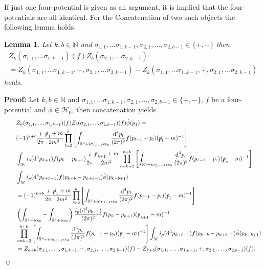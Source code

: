 \documentclass[oneside,reqno,12pt]{amsart}
\newtheorem{Lemma}[Def]{Lemma}
\begin{document}
If just one four-potential is given as an argument, it is implied that the four-potentials are all identical. For the Concatenation of two such objects the following lemma holds.
\begin{Lemma}\label{Z_concatenation}
Let \(k,b\in\mathbb{N}\) and \(\sigma_{1,1},\dots\sigma_{1,k-1},\sigma_{2,1},\dots,\sigma_{2,b-1}\in \{+,-\}\) then 
\begin{align}\tag*{}
Z_k(\sigma_{1,1},\dots\sigma_{1,k-1})(f) Z_b(\sigma_{2,1},\dots\sigma_{2,k-1})\\
=Z_k (\sigma_{1,1},\dots\sigma_{1,k-1},-,\sigma_{2,1},\dots\sigma_{2,k-1})-
Z_k (\sigma_{1,1},\dots\sigma_{1,k-1},+,\sigma_{2,1},\dots\sigma_{2,k-1})
\end{align}
holds.
\end{Lemma}
{\bf Proof:} Let \(k,b\in\mathbb{N}\) and \(\sigma_{1,1},\dots\sigma_{1,k-1},\sigma_{2,1},\dots,\sigma_{2,b-1}\in \{+,-\}\), \(f\) be a four-potential and \(\phi\in \mathcal{H}_0\), then concatenation yields
\begin{align}\tag*{}
&Z_k(\sigma_{1,1},\dots\sigma_{1,k-1})(f) Z_b(\sigma_{2,1},\dots\sigma_{2,k-1})(f) \hat{\phi}(p_1)=\\\tag*{}
&(-1)^{k+b}\frac{i}{2\pi}\frac{\slashed{p}_1+m}{2m^2} \prod_{l=2}^{k} \left[ \int_{\mathbb{R}^4+i\sigma_{1,l-1} \epsilon e_0}\frac{\text{d}^4p_l}{(2\pi)^{2}} \slashed{f}(p_{l-1}-p_l)  (\slashed{p}_l-m)^{-1}  
 \right]\\\tag*{}
& \int_{\mathcal{M}}  i_p(\text{d}^4p_{k+1})\slashed{f}(p_{k}-p_{k+1})
 \frac{i}{2\pi}  \frac{\slashed{p}_{k+1}+m}{2m^2} \prod_{c=k+2}^{b+k} \left[ \int_{\mathbb{R}^4+i\sigma_{2,c-1} \epsilon e_0}\frac{\text{d}^4p_c}{(2\pi)^{2}} \slashed{f}(p_{c-1}-p_c)  (\slashed{p}_c-m)^{-1}  
 \right]\\\tag*{}
 &\int_{\mathcal{M}}  i_p(\text{d}^4p_{k+b+1})\slashed{f}(p_{k+b}-p_{k+b+1})\hat{\phi}(p_{k+b+1})\\\tag*{}
 &=(-1)^{k+b}\frac{i}{2\pi}\frac{\slashed{p}_1+m}{2m^2} \prod_{l=2}^{k} \left[ \int_{\mathbb{R}^4+i\sigma_{1,l-1} \epsilon e_0}\frac{\text{d}^4p_l}{(2\pi)^{2}} \slashed{f}(p_{l-1}-p_l)  (\slashed{p}_l-m)^{-1}  
 \right]\\\tag*{}
 &\left(\int_{\mathbb{R}^4-i \epsilon e_0} -\int_{\mathbb{R}^4+i \epsilon e_0}   \right)
 \frac{ i_p(\text{d}^4p_{k+1})}{(2\pi)^2}  \slashed{f}(p_{k}-p_{k+1})
  (\slashed{p}_{k+1}-m)^{-1}\\\tag*{}
 & \prod_{c=k+2}^{b+k} \left[ \int_{\mathbb{R}^4+i\sigma_{2,c-1} \epsilon e_0}\frac{\text{d}^4p_c}{(2\pi)^{2}} \slashed{f}(p_{c-1}-p_c)  (\slashed{p}_c-m)^{-1}  
 \right] 
 \int_{\mathcal{M}}  i_p(\text{d}^4p_{k+b+1})\slashed{f}(p_{k+b}-p_{k+b+1})\hat{\phi}(p_{k+b+1})\\
& =Z_{k+b}(\sigma_{1,1},\dots,\sigma_{1,k-1},-,\sigma_{2,1},\dots,\sigma_{2,b-1})(f)-Z_{k+b}(\sigma_{1,1},\dots,\sigma_{1,k-1},+,\sigma_{2,1},\dots,\sigma_{2,b-1})(f)
.\end{align}\qed
\end{document}
